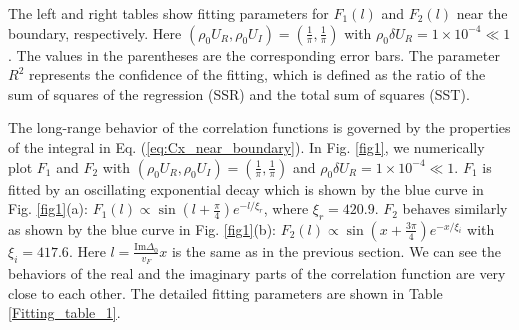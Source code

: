\documentclass[aps,prl,twocolumn,superscriptaddress]{revtex4-1}
\begin{document}
\begin{bibunit}
\begin{table}
	\caption{The left and right tables show fitting parameters for $F_1(l)$ and $F_2(l)$ near the boundary, respectively. Here $(\rho_{0}U_{R},\rho_{0}U_{I})=(\frac{1}{\pi},\frac{1}{\pi})$ with $\rho_{0}\delta U_{R}=1\times10^{-4}\ll1$. The values in the parentheses are the corresponding error bars. The parameter $R^2$ represents the confidence of the fitting, which is defined as the ratio of the sum of squares of the regression (SSR) and the total sum of squares (SST).}
	\label{Fitting_table_1}
\end{table}
The long-range behavior of the correlation functions is governed by the properties of the integral in Eq. (\ref{eq:Cx_near_boundary}). In Fig. \ref{fig1}, we numerically plot $F_1$ and $F_2$ with $(\rho_{0}U_{R},\rho_{0}U_{I})=(\frac{1}{\pi},\frac{1}{\pi})$ and $\rho_{0}\delta U_{R}=1\times10^{-4}\ll1$. $F_1$ is fitted by an oscillating exponential decay  which is shown by the blue curve
in Fig. \ref{fig1}(a): $F_1(l)\propto\sin(l+\frac{\pi}{4})e^{-l/\xi_{r}}$,
where $\xi_{r}=420.9$. $F_2$ behaves similarly as
shown by the blue curve in Fig. \ref{fig1}(b): $F_2(l) \propto\sin(x+\frac{3\pi}{4})e^{-x/\xi_{i}}$
with $\xi_{i}=417.6$. Here $l=\frac{\text{Im}\Delta_0}{v_F}x$ is the same as in the previous section. We can see the behaviors of the real and the
imaginary parts of the correlation function are very close
to each other. The detailed fitting parameters are shown in Table \ref{Fitting_table_1}.




\end{bibunit}
\end{document}
